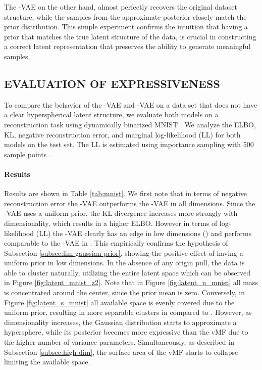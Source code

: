\documentclass[letterpaper]{article}
\begin{document}
The \Sv-VAE on the other hand, almost perfectly recovers the original dataset structure, while the samples from the approximate posterior closely match the prior distribution. This simple experiment confirms the intuition that having a prior that matches the true latent structure of the data, is crucial in constructing a correct latent representation that preserves the ability to generate meaningful samples. 

\subsection{EVALUATION OF EXPRESSIVENESS} \label{subsec:mnist}
To compare the behavior of the -VAE and -VAE on a data set that does not have a clear hyperspherical latent structure, we evaluate both models on a reconstruction task using dynamically binarized MNIST \citep{salakhutdinov2008quantitative}. We analyze the ELBO, KL, negative reconstruction error, and marginal log-likelihood (LL) for both models on the test set. The LL is estimated using importance sampling with 500 sample points \citep{burda2015importance}.

\paragraph{Results}
Results are shown in Table \ref{tab:mnist}. We first note that in terms of negative reconstruction error the \Sv-VAE outperforms the \Nv-VAE in all dimensions. Since the \Sv-VAE uses a uniform prior, the KL divergence increases more strongly with dimensionality, which results in a higher ELBO. However in terms of log-likelihood (LL) the \Sv-VAE clearly has an edge in low dimensions () and performs comparable to the \Nv-VAE in . This empirically confirms the hypothesis of Subsection \ref{subsec:lim-gaussian-prior}, showing the positive effect of having a uniform prior in low dimensions. In the absence of any origin pull, the data is able to cluster naturally, utilizing the entire latent space which can be observed in Figure \ref{fig:latent_mnist_z2}. Note that in Figure \ref{fig:latent_n_mnist} all mass is concentrated around the center, since the prior mean is zero. Conversely, in Figure \ref{fig:latent_s_mnist} all available space is evenly covered due to the uniform prior, resulting in more separable clusters in  compared to . However, as dimensionality increases, the Gaussian distribution starts to approximate a hypersphere, while its posterior becomes more expressive than the vMF due to the higher number of variance parameters. Simultaneously, as described in Subsection \ref{subsec:high-dim}, the surface area of the vMF starts to collapse limiting the available space.
\end{document}
